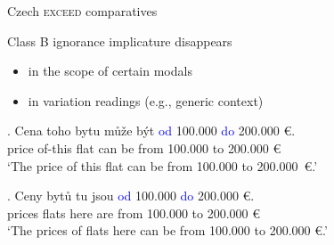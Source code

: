 \documentclass[12pt]{beamer}
\begin{document}
\begin{frame}{Czech \textsc{exceed} comparatives}

Class B ignorance implicature disappears

\begin{itemize}
\item in the scope of certain modals
\item in variation readings (e.g., generic context)
\end{itemize}

\exg. Cena toho bytu může být \textcolor{blue}{od} 100.000 \textcolor{blue}{do} {200.000 {\euro}}.\label{ex:classB-modal}\label{ex:classB-modal-variation}\\
price of-this flat can be from 100.000 to {200.000 {\euro}}\\
`The price of this flat can be from 100.000 to 200.000~{\euro}.'

\exg. Ceny bytů tu jsou \textcolor{blue}{od} 100.000 \textcolor{blue}{do} {200.000 {\euro}}.\label{ex:classB-variation}\\
prices flats here are from 100.000 to {200.000 {\euro}}\\
`The prices of flats here can be from 100.000 to 200.000 {\euro}.'


\end{frame}
\end{document}

